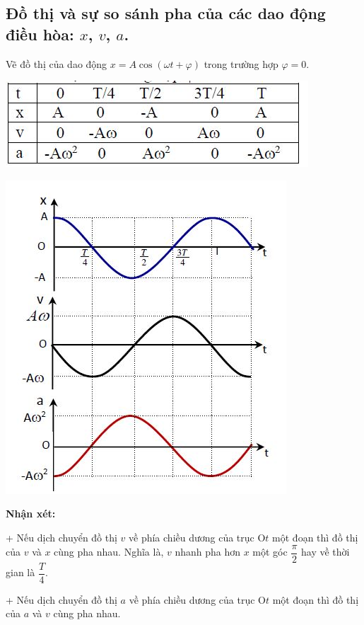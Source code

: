 \subsection{Đồ thị và sự so sánh pha của các dao động điều hòa: $x$, $v$, $a$.}
Vẽ đồ thị của dao động $x = A \cos(\omega t+\varphi)$ trong trường hợp $\varphi =0$.
\begin{center}
	\includegraphics[scale=0.7]{../figs/VN12-PH-06-A-004-2-V2-03.jpg}
\end{center}
\begin{center}
	\includegraphics[scale=0.8]{../figs/VN12-PH-06-A-004-2-V2-04.jpg}
\end{center}

\textbf{Nhận xét:}

+ Nếu dịch chuyển đồ thị $v$ về phía chiều dương của trục O$t$ một đoạn thì đồ thị của $v$ và $x$ cùng pha nhau. Nghĩa là, $v$ nhanh pha hơn $x$ một góc $\dfrac{\pi}{2}$ hay về thời gian là $\dfrac{T}{4}$.

+ Nếu dịch chuyển đồ thị $a$ về phía chiều dương của trục O$t$ một đoạn thì đồ thị của $a$ và $v$ cùng pha nhau.

